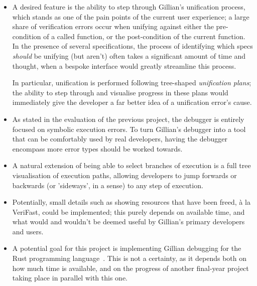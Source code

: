 \begin{itemize}

  \item A desired feature is the ability to step through Gillian's unification
        process, which stands as one of the pain points of the current user
        experience; a large share of verification errors occur when unifying
        against either the pre-condition of a called function, or the
        post-condition of the current function. In the presence of several
        specifications, the process of identifying which specs \textit{should}
        be unifying (but aren't) often takes a significant amount of time and
        thought, when a bespoke interface would greatly streamline this process.

        In particular, unification is performed following tree-shaped
        \textit{unification plans}; the ability to step through and visualise
        progress in these plans would immediately give the developer a far
        better idea of a unification error's cause.

  \item As stated in the evaluation of the previous project, the debugger is
        entirely focused on symbolic execution errors. To turn Gillian's
        debugger into a tool that can be comfortably used by real developers,
        having the debugger encompass more error types should be worked towards.

  \item A natural extension of being able to select branches of execution is a
        full tree visualisation of execution paths, allowing developers to jump
        forwards or backwards (or 'sideways', in a sense) to any step of
        execution.

  \item Potentially, small details such as showing resources that have been
        freed, à la VeriFast, could be implemented; this purely depends on
        available time, and what would and wouldn't be deemed useful by
        Gillian's primary developers and users.

  \item A potential goal for this project is implementing Gillian debugging for
        the Rust programming language~\cite{rust}. This is not a certainty, as
        it depends both on how much time is available, and on the progress of
        another final-year project taking place in parallel with this one.

\end{itemize}

